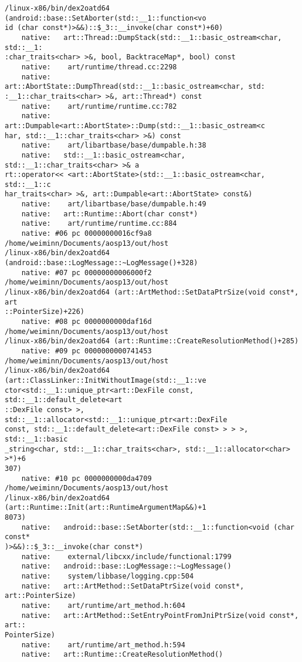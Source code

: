 \begin{lstlisting}
/linux-x86/bin/dex2oatd64 (android::base::SetAborter(std::__1::function<vo
id (char const*)>&&)::$_3::__invoke(char const*)+60)
    native:   art::Thread::DumpStack(std::__1::basic_ostream<char, std::__1:
:char_traits<char> >&, bool, BacktraceMap*, bool) const
    native:    art/runtime/thread.cc:2298
    native:   art::AbortState::DumpThread(std::__1::basic_ostream<char, std:
:__1::char_traits<char> >&, art::Thread*) const
    native:    art/runtime/runtime.cc:782
    native:   art::Dumpable<art::AbortState>::Dump(std::__1::basic_ostream<c
har, std::__1::char_traits<char> >&) const
    native:    art/libartbase/base/dumpable.h:38
    native:   std::__1::basic_ostream<char, std::__1::char_traits<char> >& a
rt::operator<< <art::AbortState>(std::__1::basic_ostream<char, std::__1::c
har_traits<char> >&, art::Dumpable<art::AbortState> const&)
    native:    art/libartbase/base/dumpable.h:49
    native:   art::Runtime::Abort(char const*)
    native:    art/runtime/runtime.cc:884
    native: #06 pc 00000000016cf9a8  /home/weiminn/Documents/aosp13/out/host
/linux-x86/bin/dex2oatd64 (android::base::LogMessage::~LogMessage()+328)
    native: #07 pc 00000000006000f2  /home/weiminn/Documents/aosp13/out/host
/linux-x86/bin/dex2oatd64 (art::ArtMethod::SetDataPtrSize(void const*, art
::PointerSize)+226)
    native: #08 pc 0000000000daf16d  /home/weiminn/Documents/aosp13/out/host
/linux-x86/bin/dex2oatd64 (art::Runtime::CreateResolutionMethod()+285)
    native: #09 pc 0000000000741453  /home/weiminn/Documents/aosp13/out/host
/linux-x86/bin/dex2oatd64 (art::ClassLinker::InitWithoutImage(std::__1::ve
ctor<std::__1::unique_ptr<art::DexFile const, std::__1::default_delete<art
::DexFile const> >, std::__1::allocator<std::__1::unique_ptr<art::DexFile 
const, std::__1::default_delete<art::DexFile const> > > >, std::__1::basic
_string<char, std::__1::char_traits<char>, std::__1::allocator<char> >*)+6
307)
    native: #10 pc 0000000000da4709  /home/weiminn/Documents/aosp13/out/host
/linux-x86/bin/dex2oatd64 (art::Runtime::Init(art::RuntimeArgumentMap&&)+1
8073)
    native:   android::base::SetAborter(std::__1::function<void (char const*
)>&&)::$_3::__invoke(char const*)
    native:    external/libcxx/include/functional:1799
    native:   android::base::LogMessage::~LogMessage()
    native:    system/libbase/logging.cpp:504
    native:   art::ArtMethod::SetDataPtrSize(void const*, art::PointerSize)
    native:    art/runtime/art_method.h:604
    native:   art::ArtMethod::SetEntryPointFromJniPtrSize(void const*, art::
PointerSize)
    native:    art/runtime/art_method.h:594
    native:   art::Runtime::CreateResolutionMethod()

\end{lstlisting}
